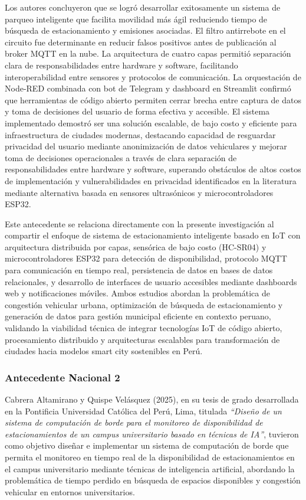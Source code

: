 \documentclass[12pt,a4paper]{article}
\begin{document}
Los autores concluyeron que se logró desarrollar exitosamente un sistema de parqueo inteligente que facilita movilidad más ágil reduciendo tiempo de búsqueda de estacionamiento y emisiones asociadas. El filtro antirrebote en el circuito fue determinante en reducir falsos positivos antes de publicación al broker MQTT en la nube. La arquitectura de cuatro capas permitió separación clara de responsabilidades entre hardware y software, facilitando interoperabilidad entre sensores y protocolos de comunicación. La orquestación de Node-RED combinada con bot de Telegram y dashboard en Streamlit confirmó que herramientas de código abierto permiten cerrar brecha entre captura de datos y toma de decisiones del usuario de forma efectiva y accesible. El sistema implementado demostró ser una solución escalable, de bajo costo y eficiente para infraestructura de ciudades modernas, destacando capacidad de resguardar privacidad del usuario mediante anonimización de datos vehiculares y mejorar toma de decisiones operacionales a través de clara separación de responsabilidades entre hardware y software, superando obstáculos de altos costos de implementación y vulnerabilidades en privacidad identificados en la literatura mediante alternativa basada en sensores ultrasónicos y microcontroladores ESP32.

Este antecedente se relaciona directamente con la presente investigación al compartir el enfoque de sistema de estacionamiento inteligente basado en IoT con arquitectura distribuida por capas, sensórica de bajo costo (HC-SR04) y microcontroladores ESP32 para detección de disponibilidad, protocolo MQTT para comunicación en tiempo real, persistencia de datos en bases de datos relacionales, y desarrollo de interfaces de usuario accesibles mediante dashboards web y notificaciones móviles. Ambos estudios abordan la problemática de congestión vehicular urbana, optimización de búsqueda de estacionamiento y generación de datos para gestión municipal eficiente en contexto peruano, validando la viabilidad técnica de integrar tecnologías IoT de código abierto, procesamiento distribuido y arquitecturas escalables para transformación de ciudades hacia modelos smart city sostenibles en Perú.

\subsubsection{Antecedente Nacional 2}

Cabrera Altamirano y Quispe Velásquez (2025), en su tesis de grado desarrollada en la Pontificia Universidad Católica del Perú, Lima, titulada \textit{``Diseño de un sistema de computación de borde para el monitoreo de disponibilidad de estacionamientos de un campus universitario basado en técnicas de IA''}, tuvieron como objetivo diseñar e implementar un sistema de computación de borde que permita el monitoreo en tiempo real de la disponibilidad de estacionamientos en el campus universitario mediante técnicas de inteligencia artificial, abordando la problemática de tiempo perdido en búsqueda de espacios disponibles y congestión vehicular en entornos universitarios.
\end{document}
